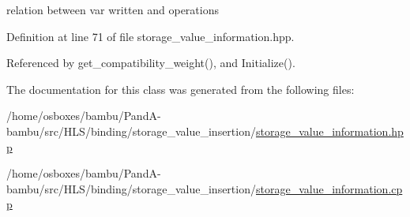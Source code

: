 relation between var written and operations 



Definition at line 71 of file storage\+\_\+value\+\_\+information.\+hpp.



Referenced by get\+\_\+compatibility\+\_\+weight(), and Initialize().



The documentation for this class was generated from the following files\+:\begin{DoxyCompactItemize}
\item 
/home/osboxes/bambu/\+Pand\+A-\/bambu/src/\+H\+L\+S/binding/storage\+\_\+value\+\_\+insertion/\hyperlink{storage__value__information_8hpp}{storage\+\_\+value\+\_\+information.\+hpp}\item 
/home/osboxes/bambu/\+Pand\+A-\/bambu/src/\+H\+L\+S/binding/storage\+\_\+value\+\_\+insertion/\hyperlink{storage__value__information_8cpp}{storage\+\_\+value\+\_\+information.\+cpp}\end{DoxyCompactItemize}

